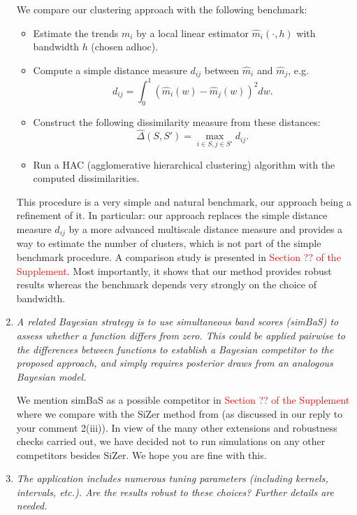 \documentclass[a4paper,12pt]{article}
\begin{document}
\begin{enumerate}[label=\arabic*.,leftmargin=0.6cm]
We compare our clustering approach with the following benchmark: 
\begin{itemize}[leftmargin=0.45cm,itemsep=0pt,topsep=0pt]
\item Estimate the trends $m_i$ by a local linear estimator $\hat{m}_i(\cdot,h)$ with bandwidth $h$ (chosen adhoc).
\item Compute a simple distance measure $d_{ij}$ between $\hat{m}_i$ and $\hat{m}_j$, e.g.
\[ d_{ij} = \int_0^1 (\hat{m}_i(w) - \hat{m}_j(w))^2 dw. \]
\item Construct the following dissimilarity measure from these distances:
\[ \hat{\Delta}(S,S') = \max_{i \in S,j \in S'} d_{ij}. \]
\item Run a HAC (agglomerative hierarchical clustering) algorithm with the computed dissimilarities. 
\end{itemize}
This procedure is a very simple and natural benchmark, our approach being a refinement of it. In particular: our approach replaces the simple distance measure $d_{ij}$ by a more advanced multiscale distance measure and provides a way to estimate the number of clusters, which is not part of the simple benchmark procedure. A comparison study is presented in \textcolor{red}{Section ?? of the Supplement}. Most importantly, it shows that our method provides robust results whereas the benchmark depends very strongly on the choice of bandwidth.  

    
\item \textit{A related Bayesian strategy is to use simultaneous band scores (simBaS) to assess whether a function differs from zero. This could be applied pairwise to the differences between functions to establish a Bayesian competitor to the proposed approach, and simply requires posterior draws from an analogous Bayesian model.}

We mention simBaS as a possible competitor in \textcolor{red}{Section ?? of the Supplement} where we compare with the SiZer method from \cite{Park2009} (as discussed in our reply to your comment 2(iii)). In view of the many other extensions and robustness checks carried out, we have decided not to run simulations on any other competitors besides SiZer. We hope you are fine with this. 

  
\item \textit{The application includes numerous tuning parameters (including kernels, intervals, etc.). Are the results robust to these choices? Further details are needed.}
  

\end{enumerate}
\end{document}
